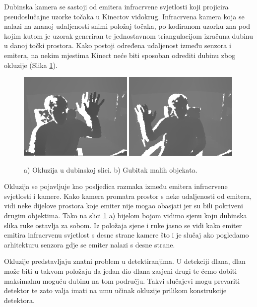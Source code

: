 \documentclass[times, utf8, diplomski, numeric]{fer}
\begin{document}
Dubinska kamera se sastoji od emitera infracrvene svjetlosti koji projicira pseudoslučajne uzorke točaka u Kinectov vidokrug. Infracrvena kamera koja se nalazi na znanoj udaljenosti snimi položaj točaka, po kodiranom uzorku zna pod kojim kutom je uzorak generiran te jednostavnom triangulacijom izračuna dubinu u danoj točki prostora. Kako postoji određena udaljenost između senzora i emitera, na nekim mjestima Kinect neće biti sposoban odrediti dubinu zbog okluzije (Slika \ref{fig:oculsion}).

\begin{figure}[h!]
    \centering
    \includegraphics[width=0.49\textwidth]{detekcija/okluzija}    
    \includegraphics[width=0.49\textwidth]{detekcija/gubitak-malih-objekata}
	\caption{a) Okluzija u dubinskoj slici. b) Gubitak malih objekata.}
	\label{fig:oculsion}
\end{figure}

Okluzija se pojavljuje kao posljedica razmaka između emitera infracrvene svjetlosti i kamere. Kako kamera promatra prostor s neke udaljenosti od emitera, vidi neke dijelove prostora koje emiter nije mogao obasjati jer su bili pokriveni drugim objektima. Tako na slici \ref{fig:oculsion} a) bijelom bojom vidimo sjenu koju dubinska slika ruke ostavlja za sobom. Iz položaja sjene i ruke jasno se vidi kako emiter emitira infracrvenu svjetlost s desne strane kamere što i je slučaj ako pogledamo arhitekturu senzora gdje se emiter nalazi s desne strane.

Okluzije predstavljaju znatni problem u detektiranjima. U detekciji dlana, dlan može biti u takvom položaju da jedan dio dlana zasjeni drugi te ćemo dobiti maksimalnu moguću dubinu na tom području. Takvi slučajevi mogu prevariti detektor te zato valja imati na umu učinak okluzije prilikom konstrukcije detektora.
\end{document}
